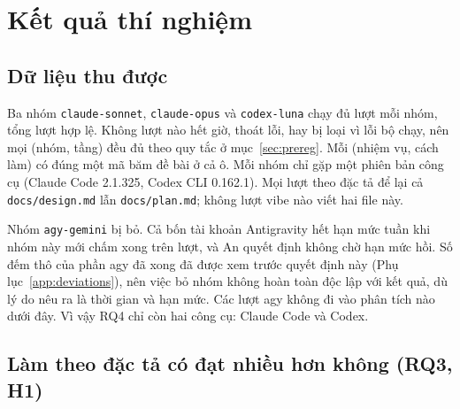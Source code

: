 \section{Kết quả thí nghiệm}\label{sec:results}

\subsection{Dữ liệu thu được}\label{sec:data-collected}

Ba nhóm \texttt{claude-sonnet}, \texttt{claude-opus} và \texttt{codex-luna} chạy đủ
\NumResRunsPerCohort{} lượt mỗi nhóm, tổng \NumResRuns{} lượt hợp lệ. Không lượt nào hết giờ, thoát lỗi,
hay bị loại vì lỗi bộ chạy, nên mọi (nhóm, tầng) đều đủ theo quy tắc ở mục~\ref{sec:prereg}. Mỗi
(nhiệm vụ, cách làm) có đúng một mã băm đề bài ở cả \NumResPromptCells{} ô. Mỗi nhóm chỉ gặp một phiên bản
công cụ (Claude Code 2.1.325, Codex CLI 0.162.1). Mọi lượt theo đặc tả để lại cả \texttt{docs/design.md}
lẫn \texttt{docs/plan.md}; không lượt vibe nào viết hai file này.

Nhóm \texttt{agy-gemini} bị bỏ. Cả bốn tài khoản Antigravity hết hạn mức tuần khi nhóm này mới chấm xong
\NumResAgyDone{} trên \NumResRunsPerCohort{} lượt, và An quyết định không chờ hạn mức hồi. Số đếm thô
của phần agy đã xong đã được xem trước quyết định này (Phụ lục~\ref{app:deviations}), nên việc bỏ nhóm
không hoàn toàn độc lập với kết quả, dù lý do nêu ra là thời gian và hạn mức. Các lượt agy không đi vào
phân tích nào dưới đây. Vì vậy RQ4 chỉ còn hai công cụ: Claude Code và Codex.

\subsection{Làm theo đặc tả có đạt nhiều hơn không (RQ3, H1)}

\begin{table}[H]
\centering\small
\caption{Tỉ lệ đạt theo nhóm, tầng và cách làm. Hiệu số là đặc tả trừ vibe, tính bằng điểm phần trăm
(đpt), khoảng tin cậy 95\% bootstrap theo nhiệm vụ. Tầng vừa và tầng lớn dưới sáu nhiệm vụ nên khoảng
tin cậy chỉ để tham khảo. ``Ủng hộ'', ``trái'', ``chưa rõ'' là kết cục đọc theo bản đăng ký.}
\label{tab:main}

\end{table}


